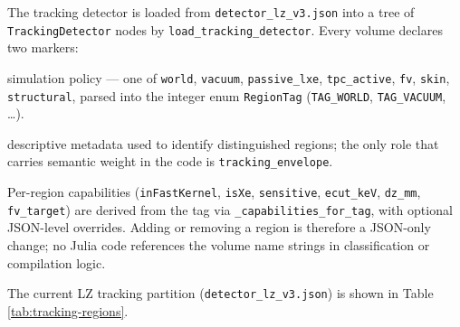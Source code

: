 \documentclass[11pt]{article}
\begin{document}
The tracking detector is loaded from \texttt{detector\_lz\_v3.json} into a
tree of \texttt{TrackingDetector} nodes by \texttt{load\_tracking\_detector}.
Every volume declares two markers:

\begin{description}[leftmargin=2.0cm,style=nextline]
\item[\texttt{tag}] simulation policy --- one of \texttt{world},
\texttt{vacuum}, \texttt{passive\_lxe}, \texttt{tpc\_active}, \texttt{fv},
\texttt{skin}, \texttt{structural}, parsed into the integer enum
\texttt{RegionTag} (\texttt{TAG\_WORLD}, \texttt{TAG\_VACUUM}, \dots).
\item[\texttt{role}] descriptive metadata used to identify distinguished
regions; the only role that carries semantic weight in the code is
\texttt{tracking\_envelope}.
\end{description}

Per-region capabilities (\texttt{inFastKernel}, \texttt{isXe},
\texttt{sensitive}, \texttt{ecut\_keV}, \texttt{dz\_mm}, \texttt{fv\_target})
are derived from the tag via \texttt{\_capabilities\_for\_tag}, with optional
JSON-level overrides. Adding or removing a region is therefore a JSON-only
change; no Julia code references the volume name strings in classification or
compilation logic.

The current LZ tracking partition (\texttt{detector\_lz\_v3.json}) is shown
in Table \ref{tab:tracking-regions}.
\end{document}
